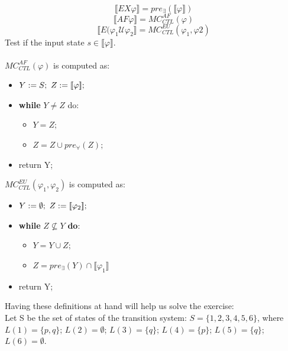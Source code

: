 \documentclass[10pt,a4paper]{article}
\begin{document}
\[ \llbracket EX\varphi \rrbracket = pre_\exists( \llbracket \varphi \rrbracket ) \]
\[ \llbracket AF\varphi \rrbracket = MC^{AF}_{CTL}(\varphi) \]
\[ \llbracket E(\varphi_1 \mathcal{U} \varphi_2 \rrbracket = MC^{EU}_{CTL}(\varphi_1, \varphi2) \]
Test if the input state $s \in \llbracket \varphi \rrbracket$.\\\\
$MC^{AF}_{CTL}(\varphi)$ is computed as:
\begin{itemize}
\item $Y:=S; \textsl{ } Z:= \llbracket \varphi \rrbracket;$
\item \textbf{while} $Y \neq Z$ do:
	\begin{itemize}
	\item $Y = Z;$
	\item $Z = Z \cup pre_\forall(Z);$ 
	\end{itemize}
\item return Y;
\end{itemize}
$MC^{EU}_{CTL}(\varphi_1, \varphi_2)$ is computed as: 
\begin{itemize}
\item $Y:=\emptyset; \textsl{ } Z:= \llbracket \varphi_2 \rrbracket;$
\item \textbf{while} $Z \not \subseteq Y$ \textbf{do}:
	\begin{itemize}
	\item $Y = Y \cup Z;$
	\item $Z = pre_\exists(Y) \cap \llbracket \varphi_1 \rrbracket$
	\end{itemize}
\item return Y;
\end{itemize}
Having these definitions at hand will help us solve the exercise:\\
Let S be the set of states of the transition system: $S = \{1, 2, 3, 4, 5, 6\}$, where\\
$L(1) = \{ p, q \}$; $L(2) = \emptyset$; $L(3) = \{ q \}$; $L(4) = \{ p \}$; $L(5) = \{ q \}$; $L(6) = \emptyset$.
\end{document}
